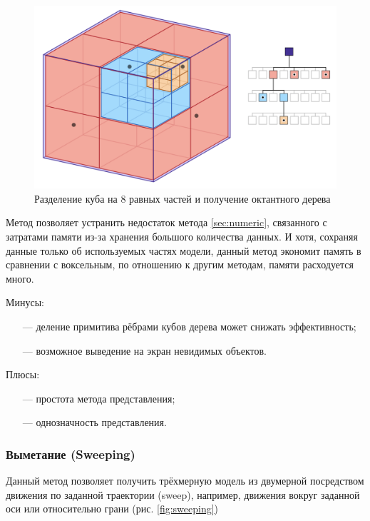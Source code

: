 \begin{figure}[h]
	\centering
	\captionsetup{justification=centering}
	\includegraphics[width=\textwidth]{img/octTree.png}
	\caption{Разделение куба на 8 равных частей и получение 
		октантного дерева}
	\label{fig:octTree}
\end{figure}

Метод позволяет устранить недостаток метода \ref{sec:numeric}, 
связанного с затратами памяти из-за хранения большого количества данных.
И хотя, сохраняя данные только об используемых частях модели, данный метод экономит память в сравнении с воксельным, по отношению к другим методам, 
памяти расходуется много.

Минусы:
\begin{itemize}[leftmargin=1.6\parindent]
	\item[---] деление примитива рёбрами кубов дерева может снижать 
	эффективность;
	\item[---] возможное выведение на экран невидимых объектов.
\end{itemize}

Плюсы:
\begin{itemize}[leftmargin=1.6\parindent]
	\item[---] простота метода представления;
	\item[---] однозначность представления.
\end{itemize}


\subsubsection{Выметание (Sweeping)}

Данный метод \cite{sweeping} позволяет получить трёхмерную модель из двумерной 
посредством движения по заданной траектории (sweep), например, движения 
вокруг заданной оси или относительно грани (рис. \ref{fig:sweeping})

